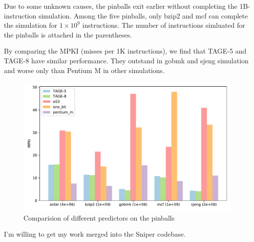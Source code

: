 \documentclass[screen,nonacm]{acmart}
\begin{document}
Due to some unknown causes, the pinballs exit earlier without completing the 1B-instruction simulation.
Among the five pinballs, only bzip2 and mcf can complete the simulation for \(1 \times 10^9 \) instructions.
The number of instructions simluated for the pinballs is attached in the parentheses.

By comparing the MPKI (misses per 1K instructions), we find that TAGE-5 and TAGE-8 have similar performance.
They outstand in gobmk and sjeng simulation and worse only than Pentium M in other simulations.

\begin{figure}
  \centering
  \includegraphics[width=0.64\linewidth]{images/1B.pdf}
  \caption{Comparision of different predictors on the pinballs}\label{fig:1b}
\end{figure}


\begin{acks}
  I'm willing to get my work merged into the Sniper codebase.
\end{acks}




\newpage

\appendix
\end{document}
